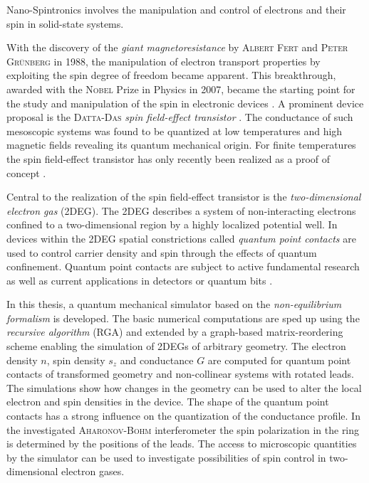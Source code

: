Nano-Spintronics involves the manipulation and control of electrons and their spin in solid-state systems.\par
With the discovery of the \emph{giant magnetoresistance} by \textsc{Albert Fert} and \textsc{Peter Gr\"unberg} in 1988, the manipulation of electron transport properties by exploiting the spin degree of freedom became apparent. This breakthrough, awarded with the \textsc{Nobel} Prize in Physics in 2007, became the starting point for the study and manipulation of the spin in electronic devices \cite{evegeny2010spin}. A prominent device proposal is the \textsc{Datta-Das} \emph{spin field-effect transistor} \cite{datta:665}. The conductance of such mesoscopic systems was found to be quantized \cite{PhysRevLett.45.494} at low temperatures and high magnetic fields revealing its quantum mechanical origin. For finite temperatures the spin field-effect transistor has only recently been realized as a proof of concept \cite{Wunderlich24122010}.\par
Central to the realization of the spin field-effect transistor is the \emph{two-dimensional electron gas} (2DEG). The 2DEG describes a system of non-interacting electrons confined to a two-dimensional region by a highly localized potential well. In devices within the 2DEG spatial constrictions called \emph{quantum point contacts} are used to control carrier density and spin through the effects of quantum confinement. Quantum point contacts are subject to active fundamental research as well as current applications in detectors \cite{PhysRevB.67.161308} or quantum bits \cite{PhysRevA.57.120}.\par
In this thesis, a quantum mechanical simulator based on the \emph{non-equilibrium \gfnc{} formalism} is developed. The basic numerical computations are sped up using the \emph{recursive \gfnc{} algorithm} (RGA) and extended by a graph-based matrix-reordering scheme enabling the simulation of 2DEGs of arbitrary geometry.
The electron density $n$, spin density $s_z$ and conductance $G$ are computed for quantum point contacts of transformed geometry and non-collinear systems with rotated leads. The simulations show how changes in the geometry can be used to alter the local electron and spin densities in the device.
The shape of the quantum point contacts has a strong influence on the quantization of the conductance profile. In the investigated \textsc{Aharonov-Bohm} interferometer the spin polarization in the ring is determined by the positions of the leads. The access to microscopic quantities by the simulator can be used to investigate possibilities of spin control in two-dimensional electron gases.
